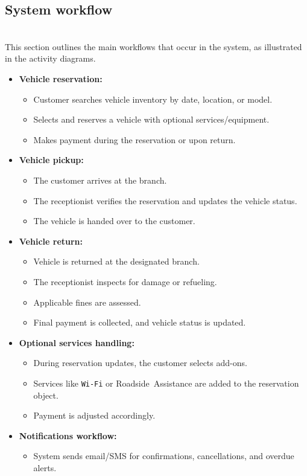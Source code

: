 \subsection{System workflow}\label{FZUizPbyEkD4ImZ08FTMN}
\\
This section outlines the main workflows that occur in the system, as illustrated in the activity diagrams.

\begin{itemize}
\item
\protect{}\label{6iJdCFlpIYvaGGnAgc77-}
\textbf{Vehicle reservation:}

\begin{itemize}
\item
Customer searches vehicle inventory by date, location, or model.
\item
Selects and reserves a vehicle with optional services/equipment.
\item
Makes payment during the reservation or upon return.
\end{itemize}
\item
\protect{}\label{WAO-pGhtIiFHtO1Vjs6lC}
\textbf{Vehicle pickup:}

\begin{itemize}
\item
The customer arrives at the branch.
\item
The receptionist verifies the reservation and updates the vehicle status.
\item
The vehicle is handed over to the customer.
\end{itemize}
\item
\protect{}\label{0Xd7somWh1zzFgLPfXwX8}
\textbf{Vehicle return:}

\begin{itemize}
\item
Vehicle is returned at the designated branch.
\item
The receptionist inspects for damage or refueling.
\item
Applicable fines are assessed.
\item
Final payment is collected, and vehicle status is updated.
\end{itemize}
\item
\protect{}\label{UzKB-wNXkKz0t7W9cNWx-}
\textbf{Optional services handling:}

\begin{itemize}
\item
During reservation updates, the customer selects add-ons.
\item
Services like \texttt{Wi-Fi} or Roadside\ Assistance are added to the reservation object.
\item
Payment is adjusted accordingly.
\end{itemize}
\item
\protect{}\label{7smvXn4M7_mTWmhloLtMI}
\textbf{Notifications workflow:}

\begin{itemize}
\item
System sends email/SMS for confirmations, cancellations, and overdue alerts.
\end{itemize}
\end{itemize}

\subsection{}\label{CnJ5Z6IrtWinUF3bIXTEa}

